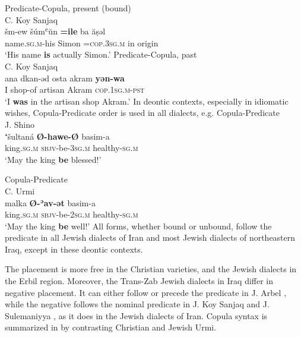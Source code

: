 \documentclass[output=paper,colorlinks,citecolor=brown,draftmode]{langscibook}
\begin{document}
\ea
\ea\label{NAINEI:ex:27a}
Predicate-Copula, present (bound)\\
C. Koy Sanjaq \citep[215.§10]{Askar2021NAArmota} \\
\gll šm-ew šúmʿŭn \textbf{=ile} ba ăṣəl \\
     name\textsc{.sg.m-}his Simon \textsc{=cop.3sg.m}  in origin \\
\glt `His name \textbf{is} actually Simon.'
\ex\label{NAINEI:ex:27b}
Predicate-Copula, past\\
C. Koy Sanjaq \citep[220.§25]{Askar2021NAArmota} \\
\gll ana dkan-əd osta akram \textbf{yən-wa} \\
    I shop-of artisan Akram \textsc{cop.1sg.m-pst} \\
\glt `I \textbf{was} in the artisan shop Akram.' 
\z
\z
In deontic contexts, especially in idiomatic wishes, Copula-Predicate order is used in all dialects, e.g.
\ea\label{NAINEI:ex:28}
Copula-Predicate\\
J. Shino \citep[231.7]{Garbell1065a} \\
\gll ⁺šultaná \textbf{Ø-hawe-Ø} basim-a \\
     king\textsc{.sg.m} \textsc{sbjv-}be\textsc{-3sg.m} healthy\textsc{-sg.m}  \\
\glt `May the king \textbf{be} blessed!'
\z

\ea\label{NAINEI:ex:29}
Copula-Predicate\\
C. Urmi \citep[A2:\S 4]{Khan2016CUrmi} \\
\gll malka \textbf{Ø-ʾav-ət} basim-a \\
     king\textsc{.sg.m} \textsc{sbjv-}be\textsc{-2sg.m} healthy\textsc{-sg.m} \\
\glt `May the king \textbf{be} well!'
\z
All  forms, whether bound or unbound, follow the predicate in all Jewish dialects of Iran and most Jewish dialects of northeastern Iraq, except in these deontic contexts. 

The  placement is more free in the Christian varieties, and the Jewish dialects in the Erbil region. Moreover, the Trans-Zab Jewish dialects in Iraq differ in negative  placement. It can either follow or precede the predicate in J. Arbel \parencite[320]{Khan1999JArbel}, while the negative  follows the nominal predicate in J. Koy Sanjaq \parencite[107]{Mutzafi2004Koya} and J. Sulemaniyya \parencite[254]{Khan2004SuleyHalab}, as it does in the Jewish dialects of Iran. Copula syntax is summarized in  by contrasting Christian and Jewish Urmi.
\end{document}
